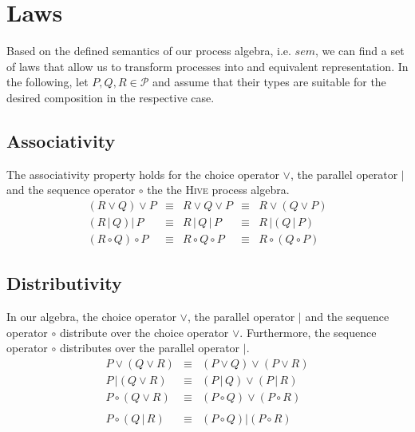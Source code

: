 \section{Laws}
\label{chp:laws}
Based on the defined semantics of our process algebra, i.e. $sem$, we can find a set of laws that allow us to transform processes into and equivalent representation. In the following, let $P, Q, R \in \mathcal{P}$ and assume that their types are suitable for the desired composition in the respective case.

\subsection{Associativity}
The associativity property holds for the choice operator $\vee$, the parallel operator $|$ and the sequence operator $\circ$ the the \textsc{Hive} process algebra.
\begin{equation*}
\begin{array}{rcccl}
  \left( R \vee Q \right) \vee P & \equiv & R \vee Q \vee P & \equiv & R \vee \left( Q \vee P \right) \\
  \left( R \,|\, Q \right) |\, P & \equiv & R \,|\, Q \,|\, P & \equiv & R \,| \left( Q \,|\, P \right) \\
  \left( R \circ Q \right) \circ P & \equiv & R \circ Q \circ P & \equiv & R \circ \left( Q \circ P \right)
\end{array}
\end{equation*}

\subsection{Distributivity}
In our algebra, the choice operator $\vee$, the parallel operator $|$ and the sequence operator $\circ$ distribute over the choice operator $\vee$. Furthermore, the sequence operator $\circ$ distributes over the parallel operator $|$.
\begin{eqnarray*}
  P \vee \left( Q \vee R \right) & \equiv & \left( P \vee Q \right) \vee \left( P \vee R \right) \\
  P \,| \left( Q \vee R \right) & \equiv & \left( P \,|\, Q \right) \vee \left( P \,|\, R \right) \\
  P \circ \left( Q \vee R \right) & \equiv & \left( P \circ Q \right) \vee \left( P \circ R \right) \\
  & & \\
  P \circ \left( Q \,|\, R \right) & \equiv & \left( P \circ Q \right) | \left( P \circ R \right)
\end{eqnarray*}

